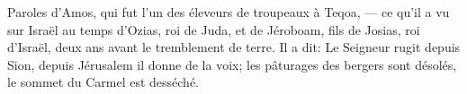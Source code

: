 Paroles d’Amos, qui fut l’un des éleveurs de troupeaux à Teqoa,
	--- ce qu’il a vu sur Israël au temps d’Ozias, roi de Juda,
	et de Jéroboam, fils de Josias, roi d’Israël, deux ans avant le tremblement de terre.
Il a dit: Le Seigneur rugit depuis Sion, depuis Jérusalem il donne de la voix;
	les pâturages des bergers sont désolés, le sommet du Carmel est desséché.
